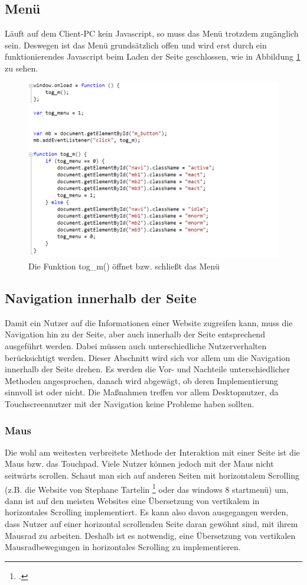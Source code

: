 \subsection{Menü}
Läuft auf dem Client-PC kein Javascript, so muss das Menü trotzdem zugänglich sein. Deswegen ist das Menü grundsätzlich offen und wird erst durch ein funktionierendes Javascript beim Laden der Seite geschlossen, wie in Abbildung \ref{js_menuevent} zu sehen.

\begin{figure} [h]
\includegraphics[width=\textwidth]{./img/js_menuevent.png}
\caption{Die Funktion tog\_m() öffnet bzw. schließt das Menü}
\label{js_menuevent}
\end{figure}

\subsection{Navigation innerhalb der Seite}
Damit ein Nutzer auf die Informationen einer Website zugreifen kann, muss die Navigation hin zu der Seite, aber auch innerhalb der Seite entsprechend ausgeführt werden. Dabei müssen auch unterschiedliche Nutzerverhalten berücksichtigt werden. Dieser Abschnitt wird sich vor allem um die Navigation innerhalb der Seite drehen. Es werden die Vor- und Nachteile unterschiedlicher Methoden angesprochen, danach wird abgewägt, ob deren Implementierung sinnvoll ist oder nicht.
Die Maßnahmen treffen vor allem Desktopnutzer, da Touchscreennutzer mit der Navigation keine Probleme haben sollten.
\subsubsection{Maus}
Die wohl am weitesten verbreitete Methode der Interaktion mit einer Seite ist die Maus bzw. das Touchpad. Viele Nutzer können jedoch mit der Maus nicht seitwärts scrollen. Schaut man sich auf anderen Seiten mit horizontalem Scrolling (z.B. die Website von Stephane Tartelin
\footcite[zu finden auf:][]{tartelin} oder das windows 8 startmenü) um, dann ist auf den meisten Websites eine Übersetzung von vertikalem in horizontales Scrolling implementiert. Es kann also davon ausgegangen werden, dass Nutzer auf einer horizontal scrollenden Seite daran gewöhnt sind, mit ihrem Mausrad zu arbeiten. Deshalb ist es notwendig, eine Übersetzung von vertikalen Mausradbewegungen in horizontales Scrolling zu implementieren. 
	
